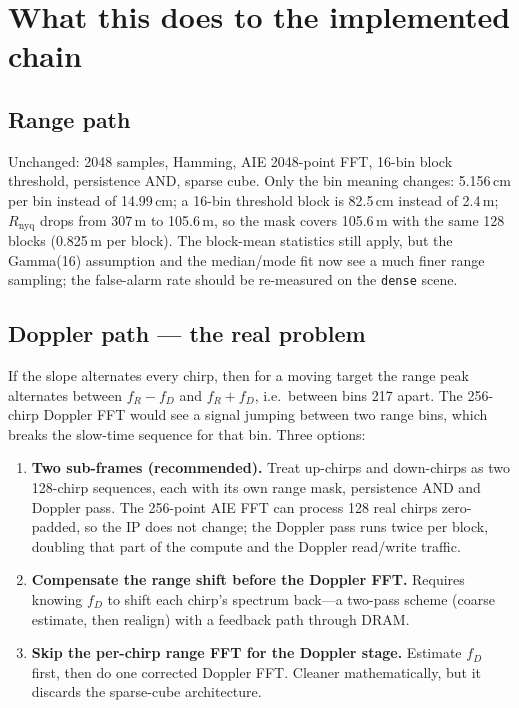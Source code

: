 \documentclass[11pt,a4paper]{article}
\newcommand{\Rnyq}{R_{\mathrm{nyq}}}
\begin{document}
\section{What this does to the implemented chain}
\label{sec:chain}

\subsection{Range path}
Unchanged: 2048 samples, Hamming, AIE 2048-point FFT, 16-bin block threshold,
persistence AND, sparse cube. Only the bin meaning changes: 5.156\,cm per bin
instead of 14.99\,cm; a 16-bin threshold block is 82.5\,cm instead of 2.4\,m;
$\Rnyq$ drops from 307\,m to 105.6\,m, so the mask covers 105.6\,m with the
same 128 blocks (0.825\,m per block). The block-mean statistics still apply,
but the Gamma(16) assumption and the median/mode fit now see a much finer
range sampling; the false-alarm rate should be re-measured on the
\texttt{dense} scene.

\subsection{Doppler path --- the real problem}
If the slope alternates every chirp, then for a moving target the range peak
alternates between $f_R-f_D$ and $f_R+f_D$, i.e.\ between bins 217 apart. The
256-chirp Doppler FFT would see a signal jumping between two range bins, which
breaks the slow-time sequence for that bin. Three options:

\begin{enumerate}[label=\arabic*.]
\item \textbf{Two sub-frames (recommended).} Treat up-chirps and down-chirps as
two 128-chirp sequences, each with its own range mask, persistence AND and
Doppler pass. The 256-point AIE FFT can process 128 real chirps zero-padded, so
the IP does not change; the Doppler pass runs twice per block, doubling that
part of the compute and the Doppler read/write traffic.
\item \textbf{Compensate the range shift before the Doppler FFT.} Requires
knowing $f_D$ to shift each chirp's spectrum back---a two-pass scheme (coarse
estimate, then realign) with a feedback path through DRAM.
\item \textbf{Skip the per-chirp range FFT for the Doppler stage.} Estimate
$f_D$ first, then do one corrected Doppler FFT. Cleaner mathematically, but it
discards the sparse-cube architecture.
\end{enumerate}
\end{document}
